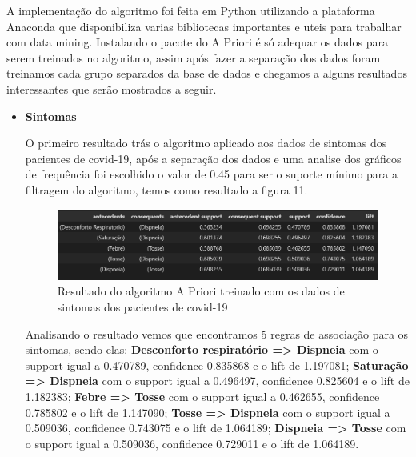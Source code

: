\documentclass[tcc1]{uftex}
\begin{document}
 A implementação do algoritmo foi feita em Python utilizando a plataforma Anaconda que disponibiliza varias bibliotecas importantes e uteis para trabalhar com data mining. Instalando o pacote do A Priori é só adequar os dados para serem treinados no algoritmo, assim após fazer a separação dos dados foram treinamos cada grupo separados da base de dados e chegamos a alguns resultados interessantes que serão mostrados a seguir.

 \begin{itemize}
   \item\textbf{Sintomas}
   \setlength{\parindent}{1.2cm}
   
   O primeiro resultado trás o algoritmo aplicado aos dados de sintomas dos pacientes de covid-19, após a separação dos dados e uma analise dos gráficos de frequência foi escolhido o valor de 0.45 para ser o suporte mínimo para a filtragem do algoritmo, temos como resultado a figura 11. 
   
    \begin{figure}[!h]
    \centering
    \includegraphics[width=15cm]{resultado_apriori_01.png} %
    \caption{Resultado do algoritmo A Priori treinado com os dados de sintomas dos pacientes de covid-19 }
    \end{figure}
    
    Analisando o resultado vemos que encontramos 5 regras de associação para os sintomas, sendo elas: 
    \textbf{Desconforto respiratório => Dispneia} com o support igual a 0.470789, confidence 0.835868 e o lift de 1.197081;
    \textbf{Saturação => Dispneia} com o support igual a 0.496497, confidence 0.825604 e o lift de 1.182383; 
    \textbf{Febre => Tosse} com o support igual a 0.462655, confidence 0.785802 e o lift de 1.147090;
    \textbf{Tosse => Dispneia} com o support igual a 0.509036, confidence 0.743075 e o lift de 1.064189;
    \textbf{Dispneia => Tosse} com o support igual a 0.509036, confidence 0.729011 e o lift de 1.064189.
    

\end{itemize}
\end{document}
